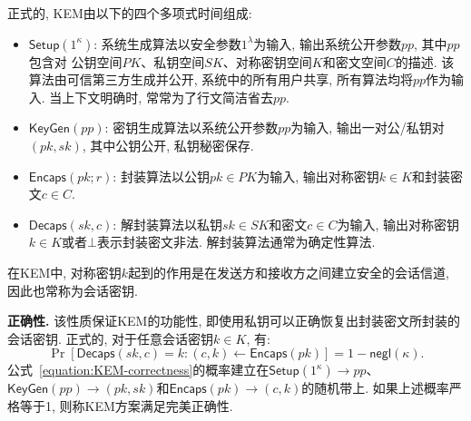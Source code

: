 \begin{definition}[密钥封装机制]
正式的, KEM由以下的四个多项式时间组成: 
\begin{itemize}
\item $\mathsf{Setup}(1^\kappa)$: 系统生成算法以安全参数$1^\lambda$为输入, 输出系统公开参数$pp$, 其中$pp$包含对
	公钥空间$PK$、私钥空间$SK$、对称密钥空间$K$和密文空间$C$的描述. 
	该算法由可信第三方生成并公开, 系统中的所有用户共享, 所有算法均将$pp$作为输入.  
	当上下文明确时, 常常为了行文简洁省去$pp$. 

\item $\mathsf{KeyGen}(pp)$: 密钥生成算法以系统公开参数$pp$为输入, 输出一对公/私钥对$(pk, sk)$, 其中公钥公开, 私钥秘密保存. 

\item $\mathsf{Encaps}(pk; r)$: 封装算法以公钥$pk \in PK$为输入, 输出对称密钥$k \in K$和封装密文$c \in C$.  

\item $\mathsf{Decaps}(sk, c)$: 解封装算法以私钥$sk \in SK$和密文$c \in C$为输入, 
	输出对称密钥$k \in K$或者$\bot$表示封装密文非法. 解封装算法通常为确定性算法. 
\end{itemize}
\end{definition}

\begin{remark}
在KEM中, 对称密钥$k$起到的作用是在发送方和接收方之间建立安全的会话信道, 因此也常称为会话密钥. 
\end{remark}

\begin{trivlist}
\item \textbf{正确性.} 该性质保证KEM的功能性, 即使用私钥可以正确恢复出封装密文所封装的会话密钥. 
正式的, 对于任意会话密钥$k \in K$, 有:
\begin{equation}\label{equation:KEM-correctness}
	\Pr[\mathsf{Decaps}(sk, c) = k: (c, k) \leftarrow \mathsf{Encaps}(pk)] = 1 - \mathsf{negl}(\kappa).
\end{equation}
公式~\eqref{equation:KEM-correctness}的概率建立在$\mathsf{Setup}(1^\kappa) \rightarrow pp$、
$\mathsf{KeyGen}(pp) \rightarrow (pk, sk)$和$\mathsf{Encaps}(pk) \rightarrow (c, k)$的随机带上. 
如果上述概率严格等于1, 则称KEM方案满足完美正确性. 
\end{trivlist}

